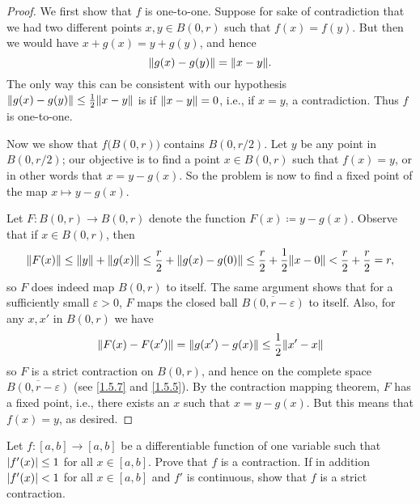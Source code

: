 \begin{proof}
  We first show that \(f\) is one-to-one.
  Suppose for sake of contradiction that we had two different points \(x, y \in B(0, r)\) such that \(f(x) = f(y)\).
  But then we would have \(x + g(x) = y + g(y)\), and hence
  \[
    \norm*{g(x) - g(y)} = \norm*{x - y}.
  \]
  The only way this can be consistent with our hypothesis \(\norm*{g(x) - g(y)} \leq \frac{1}{2} \norm*{x - y}\) is if \(\norm*{x - y} = 0\), i.e., if \(x = y\), a contradiction.
  Thus \(f\) is one-to-one.

  Now we show that \(f\big(B(0, r)\big)\) contains \(B(0, r / 2)\).
  Let \(y\) be any point in \(B(0, r / 2)\);
  our objective is to find a point \(x \in B(0, r)\) such that \(f(x) = y\), or in other words that \(x = y - g(x)\).
  So the problem is now to find a fixed point of the map \(x \mapsto y - g(x)\).

  Let \(F : B(0, r) \to B(0, r)\) denote the function \(F(x) \coloneqq y - g(x)\).
  Observe that if \(x \in B(0, r)\), then
  \[
    \norm*{F(x)} \leq \norm*{y} + \norm*{g(x)} \leq \frac{r}{2} + \norm*{g(x) - g(0)} \leq \frac{r}{2} + \frac{1}{2} \norm*{x - 0} < \frac{r}{2} + \frac{r}{2} = r,
  \]
  so \(F\) does indeed map \(B(0, r)\) to itself.
  The same argument shows that for a sufficiently small \(\varepsilon > 0\), \(F\) maps the closed ball \(\overline{B(0, r - \varepsilon)}\) to itself.
  Also, for any \(x, x'\) in \(B(0, r)\) we have
  \[
    \norm*{F(x) - F(x')} = \norm*{g(x') - g(x)} \leq \frac{1}{2} \norm*{x' - x}
  \]
  so \(F\) is a strict contraction on \(B(0, r)\), and hence on the complete space \(\overline{B(0, r - \varepsilon)}\) (see \cref{1.5.7} and \cref{1.5.5}).
  By the contraction mapping theorem, \(F\) has a fixed point, i.e., there exists an \(x\) such that \(x = y - g(x)\).
  But this means that \(f(x) = y\), as desired.
\end{proof}

\exercisesection

\begin{exercise}\label{ex 6.6.1}
  Let \(f : [a, b] \to [a, b]\) be a differentiable function of one variable such that \(\abs{f'(x)} \leq 1\) for all \(x \in [a, b]\).
  Prove that \(f\) is a contraction.
  If in addition \(\abs{f'(x)} < 1\) for all \(x \in [a, b]\) and \(f'\) is continuous, show that \(f\) is a strict contraction.
\end{exercise}

